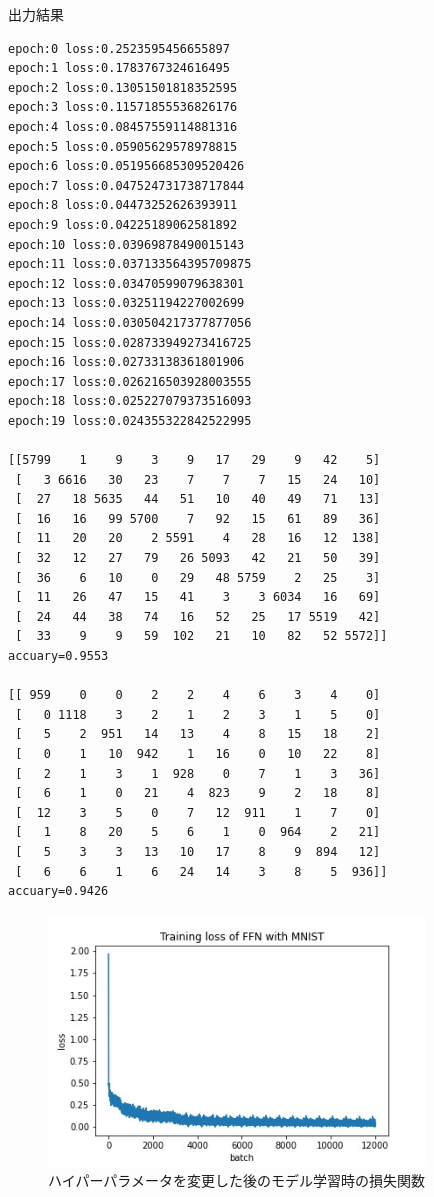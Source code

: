 \documentclass[11pt, a4paper]{jsarticle}
\begin{document}
  \begin{itembox}[l]{出力結果}
    {\footnotesize
    \begin{verbatim}
epoch:0 loss:0.2523595456655897
epoch:1 loss:0.1783767324616495
epoch:2 loss:0.13051501818352595
epoch:3 loss:0.11571855536826176
epoch:4 loss:0.08457559114881316
epoch:5 loss:0.05905629578978815
epoch:6 loss:0.051956685309520426
epoch:7 loss:0.047524731738717844
epoch:8 loss:0.04473252626393911
epoch:9 loss:0.04225189062581892
epoch:10 loss:0.03969878490015143
epoch:11 loss:0.037133564395709875
epoch:12 loss:0.03470599079638301
epoch:13 loss:0.03251194227002699
epoch:14 loss:0.030504217377877056
epoch:15 loss:0.028733949273416725
epoch:16 loss:0.02733138361801906
epoch:17 loss:0.026216503928003555
epoch:18 loss:0.025227079373516093
epoch:19 loss:0.024355322842522995

[[5799    1    9    3    9   17   29    9   42    5]
 [   3 6616   30   23    7    7    7   15   24   10]
 [  27   18 5635   44   51   10   40   49   71   13]
 [  16   16   99 5700    7   92   15   61   89   36]
 [  11   20   20    2 5591    4   28   16   12  138]
 [  32   12   27   79   26 5093   42   21   50   39]
 [  36    6   10    0   29   48 5759    2   25    3]
 [  11   26   47   15   41    3    3 6034   16   69]
 [  24   44   38   74   16   52   25   17 5519   42]
 [  33    9    9   59  102   21   10   82   52 5572]]
accuary=0.9553

[[ 959    0    0    2    2    4    6    3    4    0]
 [   0 1118    3    2    1    2    3    1    5    0]
 [   5    2  951   14   13    4    8   15   18    2]
 [   0    1   10  942    1   16    0   10   22    8]
 [   2    1    3    1  928    0    7    1    3   36]
 [   6    1    0   21    4  823    9    2   18    8]
 [  12    3    5    0    7   12  911    1    7    0]
 [   1    8   20    5    6    1    0  964    2   21]
 [   5    3    3   13   10   17    8    9  894   12]
 [   6    6    1    6   24   14    3    8    5  936]]
accuary=0.9426
    \end{verbatim}}
  \end{itembox}

  \newpage

  \begin{figure}[h]
    \centering
    \includegraphics[width=10cm]{images/exercise4.3.jpg}
    \caption{ハイパーパラメータを変更した後のモデル学習時の損失関数}
    \label{fig:mnist-ffn-tuned-loss}
  \end{figure}
\end{document}
